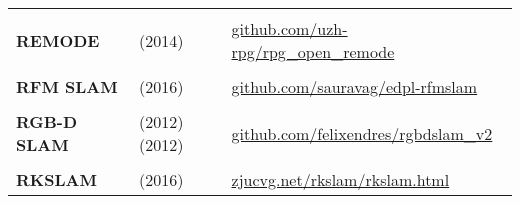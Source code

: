 \documentclass[a4paper,12pt]{scrartcl}
\begin{document}
{\begin{longtable}{l|l|l}
                                                                                                                                  &                                                                                            &   \\ [-3mm]
    \textbf{REMODE}                                                                                                               & \cite{Pizzoli2014} (2014)
                                                                                                                                  & {\href{https://github.com/uzh-rpg/rpg_open_remode}{github.com/uzh-rpg/rpg\_open\_remode}} \\
                                                                                                                                  &                                                                                            &   \\ [-3mm]
    \textbf{RFM SLAM}                                                                                                             & \cite{Agarwal2016} (2016)
                                                                                                                                  & {\href{https://github.com/sauravag/edpl-rfmslam}{github.com/sauravag/edpl-rfmslam}}       \\
                                                                                                                                  &                                                                                            &   \\ [-3mm]
    \textbf{RGB-D SLAM}                                                                                                           & \cite{Endres2012} (2012) \cite{Endres2012a} (2012)
                                                                                                                                  & {\href{https://github.com/felixendres/rgbdslam_v2}{github.com/felixendres/rgbdslam\_v2}}  \\
                                                                                                                                  &                                                                                            &   \\ [-3mm]
    \textbf{RKSLAM}                                                                                                               & \cite{Liu2016} (2016)
                                                                                                                                  & {\href{https://zjucvg.net/rkslam/rkslam.html}{zjucvg.net/rkslam/rkslam.html}}             \\

\end{longtable}}
\end{document}

